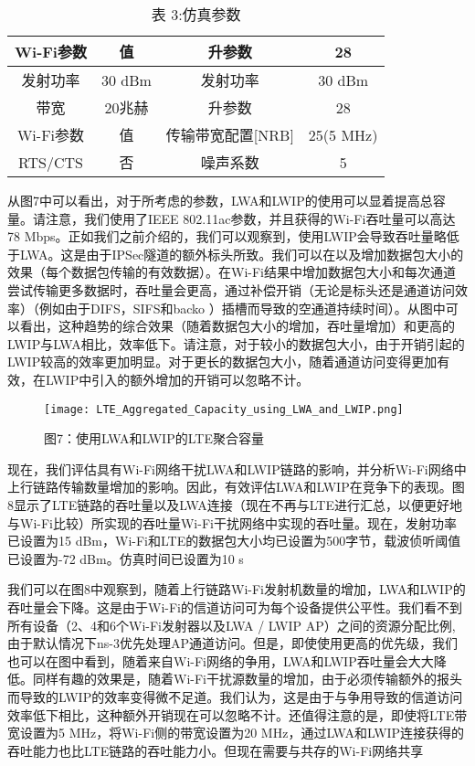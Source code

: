 \begin{table}
  \centering
  \caption*{表 3:仿真参数}
  \begin{tabular}{|c|c|c|c|}   %
   \hline         %
    Wi-Fi参数 & 值 & 升参数 & 28\\
    \hline 
    发射功率 & 30 dBm & 发射功率 & 30 dBm\\
    \hline 
    带宽 & 20兆赫 & 升参数 & 28\\
    \hline 
    Wi-Fi参数 & 值 & 传输带宽配置[NRB] & 25(5 MHz)\\
    \hline 
    RTS/CTS & 否 & 噪声系数 & 5\\
    \hline 
\end{tabular}
\end{table}


从图7中可以看出，对于所考虑的参数，LWA和LWIP的使用可以显着提高总容量。请注意，我们使用了IEEE 802.11ac参数，并且获得的Wi-Fi吞吐量可以高达78 Mbps。正如我们之前介绍的，我们可以观察到，使用LWIP会导致吞吐量略低于LWA。这是由于IPSec隧道的额外标头所致。我们可以在以及增加数据包大小的效果（每个数据包传输的有效数据）。在Wi-Fi结果中增加数据包大小和每次通道尝试传输更多数据时，吞吐量会更高，通过补偿开销（无论是标头还是通道访问效率）（例如由于DIFS，SIFS和backo ）插槽而导致的空通道持续时间）。从图中可以看出，这种趋势的综合效果（随着数据包大小的增加，吞吐量增加）和更高的LWIP与LWA相比，效率低下。请注意，对于较小的数据包大小，由于开销引起的LWIP较高的效率更加明显。对于更长的数据包大小，随着通道访问变得更加有效，在LWIP中引入的额外增加的开销可以忽略不计。

\begin{figure}[htb]
  \centering
  \texttt{[image: LTE\_Aggregated\_Capacity\_using\_LWA\_and\_LWIP.png]}
  \caption*{图7：使用LWA和LWIP的LTE聚合容量}
\end{figure}

现在，我们评估具有Wi-Fi网络干扰LWA和LWIP链路的影响，并分析Wi-Fi网络中上行链路传输数量增加的影响。因此，有效评估LWA和LWIP在竞争下的表现。图8显示了LTE链路的吞吐量以及LWA连接（现在不再与LTE进行汇总，以便更好地与Wi-Fi比较）所实现的吞吐量Wi-Fi干扰网络中实现的吞吐量。现在，发射功率已设置为15 dBm，Wi-Fi和LTE的数据包大小均已设置为500字节，载波侦听阈值已设置为-72 dBm。仿真时间已设置为10 s

我们可以在图8中观察到，随着上行链路Wi-Fi发射机数量的增加，LWA和LWIP的吞吐量会下降。这是由于Wi-Fi的信道访问可为每个设备提供公平性。我们看不到所有设备（2、4和6个Wi-Fi发射器以及LWA / LWIP AP）之间的资源分配比例,由于默认情况下ns-3优先处理AP通道访问。但是，即使使用更高的优先级，我们也可以在图中看到，随着来自Wi-Fi网络的争用，LWA和LWIP吞吐量会大大降低。同样有趣的效果是，随着Wi-Fi干扰源数量的增加，由于必须传输额外的报头而导致的LWIP的效率变得微不足道。我们认为，这是由于与争用导致的信道访问效率低下相比，这种额外开销现在可以忽略不计。还值得注意的是，即使将LTE带宽设置为5 MHz，将Wi-Fi侧的带宽设置为20 MHz，通过LWA和LWIP连接获得的吞吐能力也比LTE链路的吞吐能力小。但现在需要与共存的Wi-Fi网络共享

